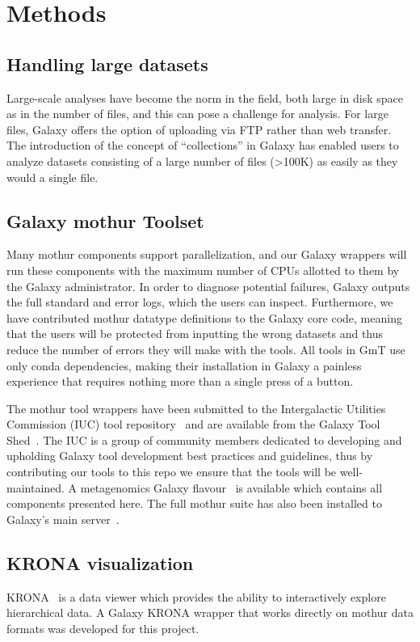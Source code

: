 \section*{Methods}

\subsection*{Handling large datasets}
Large-scale analyses have become the norm in the field, both large in disk space as in the number of files, and this can pose a challenge for analysis. For large files, Galaxy offers the option of uploading via FTP rather than web transfer. The introduction of the concept of ``collections'' in Galaxy has enabled users to analyze datasets consisting of a large number of files (>100K) as easily as they would a single file.

\subsection*{Galaxy mothur Toolset}
Many mothur components support parallelization, and our Galaxy wrappers will run these components with the maximum number of CPUs allotted to them by the Galaxy administrator. In order to diagnose potential failures, Galaxy outputs the full standard and error logs, which the users can inspect. Furthermore, we have contributed mothur datatype definitions to the Galaxy core code, meaning that the users will be protected from inputting the wrong datasets and thus reduce the number of errors they will make with the tools. All tools in GmT use only conda dependencies, making their installation in Galaxy a painless experience that requires nothing more than a single press of a button.

The mothur tool wrappers have been submitted to the Intergalactic Utilities Commission (IUC) tool repository~\cite{iuc-repo} and are available from the Galaxy Tool Shed~\cite{url-toolshed}. The IUC is a group of community members dedicated to developing and upholding Galaxy tool development best practices and guidelines, thus by contributing our tools to this repo we ensure that the tools will be well-maintained. A metagenomics Galaxy flavour~\cite{metagenomics-flavour} is available which contains all components presented here. The full mothur suite has also been installed to Galaxy's main server~\cite{usegalaxy}.

\subsection*{KRONA visualization}
KRONA~\cite{ondov2011interactive} is a data viewer which provides the ability to interactively explore hierarchical data. A Galaxy KRONA wrapper that works directly on mothur data formats was developed for this project.

